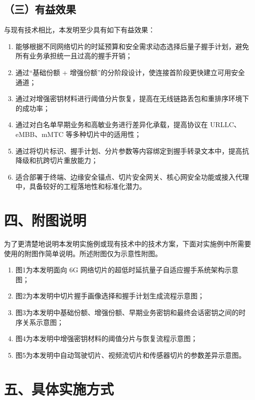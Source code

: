 \documentclass[12pt,a4paper]{article}
\begin{document}
\subsection*{（三）有益效果}

与现有技术相比，本发明至少具有如下有益效果：

\begin{enumerate}[leftmargin=2em]
    \item 能够根据不同网络切片的时延预算和安全需求动态选择后量子握手计划，避免所有业务承担统一且过高的握手开销；
    \item 通过“基础份额 + 增强份额”的分阶段设计，使连接首阶段更快建立可用安全通道；
    \item 通过对增强密钥材料进行阈值分片恢复，提高在无线链路丢包和重排序环境下的成功率；
    \item 通过对白名单早期业务和高敏业务进行差异化承载，提高协议在 URLLC、eMBB、mMTC 等多种切片中的适用性；
    \item 通过将切片标识、握手计划、分片参数等内容绑定到握手转录文本中，提高抗降级和抗跨切片重放能力；
    \item 适合部署于终端、边缘安全锚点、切片安全网关、核心网安全功能或接入代理中，具备较好的工程落地性和标准化潜力。
\end{enumerate}

\section*{四、附图说明}

为了更清楚地说明本发明实施例或现有技术中的技术方案，下面对实施例中所需要使用的附图作简单说明。所述附图仅为示意性附图。

\begin{enumerate}[leftmargin=2em]
    \item 图1为本发明面向 6G 网络切片的超低时延抗量子自适应握手系统架构示意图；
    \item 图2为本发明中切片握手画像选择和握手计划生成流程示意图；
    \item 图3为本发明中基础份额、增强份额、早期业务密钥和最终会话密钥之间的时序关系示意图；
    \item 图4为本发明中增强密钥材料的阈值分片与恢复流程示意图；
    \item 图5为本发明中自动驾驶切片、视频流切片和传感器切片的参数差异示意图。
\end{enumerate}

\section*{五、具体实施方式}
\end{document}

